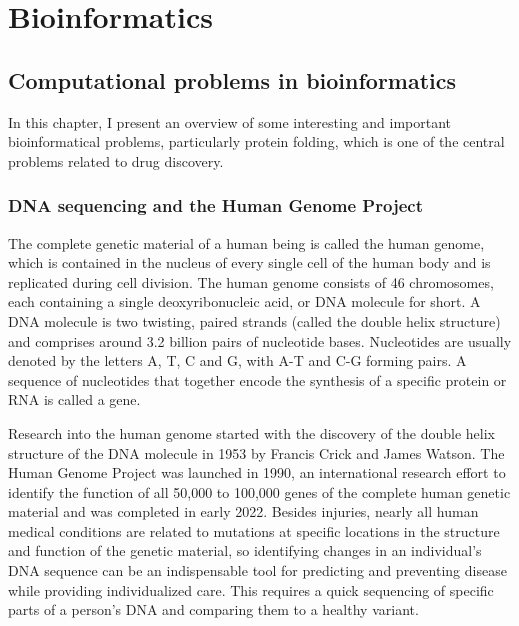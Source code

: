 \chapter{Bioinformatics}

\section{Computational problems in bioinformatics}

In this chapter, I present an overview of some interesting and important bioinformatical problems, particularly protein folding, which is one of the central problems related to drug discovery\cite{BockenhauerAlgoBioinfo}.

\subsection{DNA sequencing and the Human Genome Project}

The complete genetic material of a human being is called the human genome, which is contained in the nucleus of every single cell of the human body and is replicated during cell division. The human genome consists of 46 chromosomes, each containing a single deoxyribonucleic acid, or DNA molecule for short. A DNA molecule is two twisting, paired strands (called the double helix structure) and comprises around 3.2 billion pairs of nucleotide bases. Nucleotides are usually denoted by the letters A, T, C and G, with A-T and C-G forming pairs. A sequence of nucleotides that together encode the synthesis of a specific protein or RNA is called a gene.

Research into the human genome started with the discovery of the double helix structure of the DNA molecule in 1953 by Francis Crick and James Watson. The Human Genome Project\cite{CollinsHumanGenome1995} was launched in 1990, an international research effort to identify the function of all 50,000 to 100,000 genes of the complete human genetic material and was completed in early 2022\cite{zahn_filling_2022}. Besides injuries, nearly all human medical conditions are related to mutations at specific locations in the structure and function of the genetic material\cite{CollinsHumanGenome1995}, so identifying changes in an individual's DNA sequence can be an indispensable tool for predicting and preventing disease while providing individualized care. This requires a quick sequencing of specific parts of a person's DNA and comparing them to a healthy variant.

